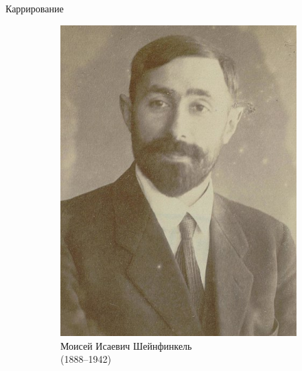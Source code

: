 \begin{frame}{Каррирование}
\begin{figure}[t]
\begin{subfigure}[t]{0.4 \textwidth}
  \end{subfigure}
\hspace{1cm}
  \begin{subfigure}[t]{0.25\textwidth}
      \begin{minipage}{1\textwidth}
      \includegraphics[width=1\textwidth]{440px-Moses_Schonfinkel_1922_(cropped).jpg}\\
      \centering      Моисей Исаевич Шейнфинкель \\(1888--1942)
    \end{minipage}
  \end{subfigure}
  \begin{subfigure}[t]{.25\textwidth}
    \begin{minipage}{1\textwidth}
      \vspace{-1mm}

\end{minipage}
\end{subfigure}
\end{figure}
\end{frame}
